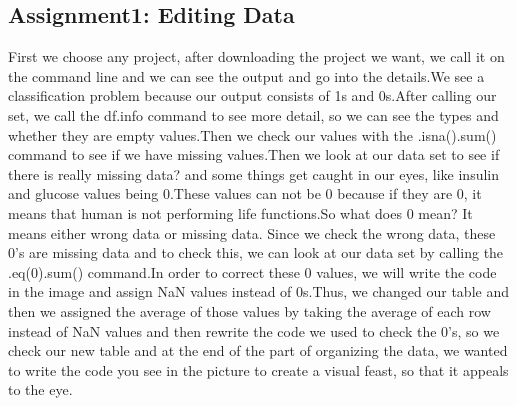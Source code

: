 \documentclass[onecolumn]{article}
\begin{document}
\subsection{Assignment1: Editing Data }
First we choose any project, after downloading the project we want, we call it on the command line and we can see the output and go into the details.We see a classification problem because our output consists of 1s and 0s.After calling our set, we call the df.info command to see more detail, so we can see the types and whether they are empty values.Then we check our values with the .isna().sum() command to see if we have missing values.Then we look at our data set to see if there is really missing data? and some things get caught in our eyes, like insulin and glucose values being 0.These values can not be 0 because if they are 0, it means that human is not performing life functions.So what does 0 mean? It means either wrong data or missing data. Since we check the wrong data, these 0's are missing data and to check this, we can look at our data set by calling the .eq(0).sum() command.In order to correct these 0 values, we will write the code in the image and assign NaN values instead of 0s.Thus, we changed our table and then we assigned the average of those values by taking the average of each row instead of NaN values and then rewrite the code we used to check the 0's, so we check our new table and at the end of the part of organizing the data, we wanted to write the code you see in the picture to create a visual feast, so that it appeals to the eye.
\end{document}
